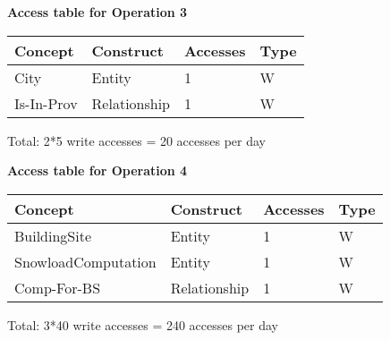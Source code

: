 {\pagebreak

{\centering \textbf{Access table for Operation 3}\\}
\begin{table}[H]
  \def\arraystretch{1.10}%
  \centering
  \begin{tabular}{ | m{4cm} | m{4cm}| m{3cm} | m{2cm} |}
    \hline
    {\textbf{\large Concept}} & {\textbf{\large Construct}} & {\textbf{\large Accesses}} & {\textbf{\large Type}} \\
    \hline
    \color[HTML]{3531FF} City & Entity & 1 & W \\
    \hline
    \color[HTML]{3531FF} Is-In-Prov & Relationship & 1 & W \\
    \hline
  \end{tabular}
\end{table}
Total: 2*5 write accesses = 20 accesses per day

\vspace{12px}

{\centering \textbf{Access table for Operation 4}\\}
\begin{table}[H]
  \def\arraystretch{1.10}%
  \centering
  \begin{tabular}{ | m{4cm} | m{4cm}| m{3cm} | m{2cm} |}
    \hline
    {\textbf{\large Concept}} & {\textbf{\large Construct}} & {\textbf{\large Accesses}} & {\textbf{\large Type}} \\
    \hline
    \color[HTML]{3531FF} BuildingSite & Entity & 1 & W \\
    \hline
    \color[HTML]{3531FF} SnowloadComputation & Entity & 1 & W \\
    \hline
    \color[HTML]{3531FF} Comp-For-BS & Relationship & 1 & W \\
    \hline
  \end{tabular}
\end{table}
Total: 3*40 write accesses = 240 accesses per day

\vspace{12px}

}
